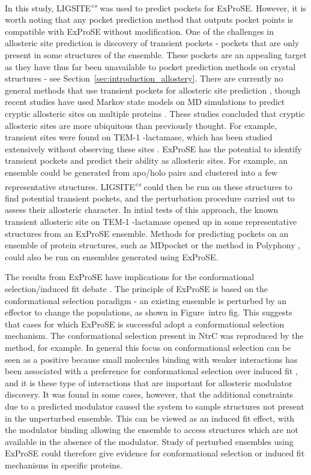 In this study, LIGSITE\textsuperscript{\it cs} was used to predict pockets for ExProSE.
However, it is worth noting that any pocket prediction method that outputs pocket points is compatible with ExProSE without modification.
One of the challenges in allosteric site prediction is discovery of transient pockets - pockets that are only present in some structures of the ensemble.
These pockets are an appealing target as they have thus far been unavailable to pocket prediction methods on crystal structures - see Section~\ref{sec:introduction_allostery}.
There are currently no general methods that use transient pockets for allosteric site prediction \cite{Boehr2009}, though recent studies have used Markov state models on MD simulations to predict cryptic allosteric sites on multiple proteins \cite{Bowman2012, Bowman2015}.
These studies concluded that cryptic allosteric sites are more ubiquitous than previously thought.
For example, transient sites were found on TEM-1 \textbeta -lactamase, which has been studied extensively without observing these sites \cite{Bowman2015}.
ExProSE has the potential to identify transient pockets and predict their ability as allosteric sites.
For example, an ensemble could be generated from apo/holo pairs and clustered into a few representative structures.
LIGSITE\textsuperscript{\it cs} could then be run on these structures to find potential transient pockets, and the perturbation procedure carried out to assess their allosteric character.
In intial tests of this approach, the known transient allosteric site on TEM-1 \textbeta -lactamase opened up in some representative structures from an ExProSE ensemble.
Methods for predicting pockets on an ensemble of protein structures, such as MDpocket \cite{Schmidtke2011} or the method in Polyphony \cite{Pitt2014}, could also be run on ensembles generated using ExProSE.

The results from ExProSE have implications for the conformational selection/induced fit debate \cite{Boehr2009}.
The principle of ExProSE is based on the conformational selection paradigm - an existing ensemble is perturbed by an effector to change the populations, as shown in Figure~intro fig.
This suggests that cases for which ExProSE is successful adopt a conformational selection mechanism.
The conformational selection present in NtrC was reproduced by the method, for example.
In general this focus on conformational selection can be seen as a positive because small molecules binding with weaker interactions has been associated with a preference for conformational selection over induced fit \cite{Okazaki2008}, and it is these type of interactions that are important for allosteric modulator discovery.
It was found in some cases, however, that the additional constraints due to a predicted modulator caused the system to sample structures not present in the unperturbed ensemble.
This can be viewed as an induced fit effect, with the modulator binding allowing the ensemble to access structures which are not available in the absence of the modulator.
Study of perturbed ensembles using ExProSE could therefore give evidence for conformational selection or induced fit mechanisms in specific proteins.

